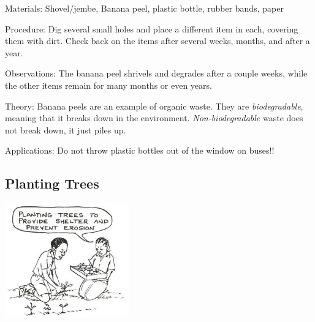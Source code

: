 \begin{multicols}{2}
\begin{description*}
\item[Materials:]{Shovel/jembe, Banana peel, plastic bottle, rubber bands, paper}
\item[Procedure:]{Dig several small holes and place a different item in each, covering them with dirt. Check back on the items after several weeks, months, and after a year.}
\item[Observations:]{The banana peel shrivels and degrades after a couple weeks, while the other items remain for many months or even years.}
\item[Theory:]{Banana peels are an example of organic waste. They are \emph{biodegradable}}, meaning that it breaks down in the environment. \emph{Non-biodegradable} waste does not break down, it just piles up.
\item[Applications:]{Do not throw plastic bottles out of the window on buses!!}
\end{description*}

\subsection{Planting Trees}

\begin{center}
\includegraphics[width=0.4\textwidth]{./img/source/planting-trees.jpg}
\end{center}


\end{multicols}
